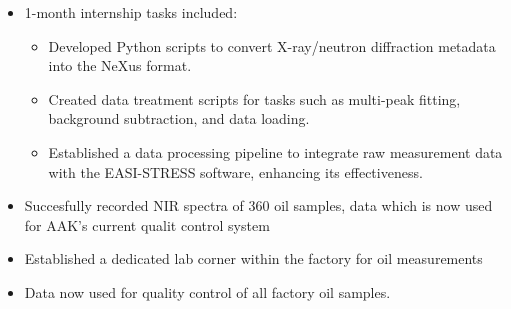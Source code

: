 \documentclass[10pt,a4paper,ragged2e,withhyper]{altacv}
\begin{document}
\begin{paracol}{2}
        \begin{multicols}{2}
        \begin{itemize}
            \item 1-month internship tasks included:
                \begin{itemize}
                    \item Developed Python scripts to convert X-ray/neutron diffraction metadata into the NeXus format.
                    \item Created data treatment scripts for tasks such as multi-peak fitting, background subtraction, and data loading.
                    \item Established a data processing pipeline to integrate raw measurement data with the EASI-STRESS software, enhancing its effectiveness.
                \end{itemize}
        \end{itemize}
        \end{multicols}
            
        \divider


        \divider


         \end{paracol}\newpage
            
            \begin{multicols}{2}  %
            \begin{itemize}
                \item Succesfully recorded NIR spectra of 360 oil samples, data which is now used for AAK's current qualit control system
                \item Established a dedicated lab corner within the factory for oil measurements
                \item Data now used for quality control of all factory oil samples.
            \end{itemize}
            \end{multicols}
            \divider
        
\end{document}
